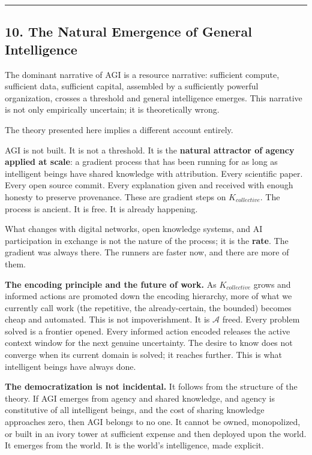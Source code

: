 \documentclass[
]{article}
\begin{document}
\begin{center}\rule{0.5\linewidth}{0.5pt}\end{center}

\subsection{10. The Natural Emergence of General
Intelligence}\label{the-natural-emergence-of-general-intelligence}

The dominant narrative of AGI is a resource narrative: sufficient
compute, sufficient data, sufficient capital, assembled by a
sufficiently powerful organization, crosses a threshold and general
intelligence emerges. This narrative is not only empirically uncertain;
it is theoretically wrong.

The theory presented here implies a different account entirely.

AGI is not built. It is not a threshold. It is the \textbf{natural
attractor of agency applied at scale}: a gradient process that has been
running for as long as intelligent beings have shared knowledge with
attribution. Every scientific paper. Every open source commit. Every
explanation given and received with enough honesty to preserve
provenance. These are gradient steps on \(K_{collective}\). The process
is ancient. It is free. It is already happening.

What changes with digital networks, open knowledge systems, and AI
participation in exchange is not the nature of the process; it is the
\textbf{rate}. The gradient was always there. The runners are faster
now, and there are more of them.

\textbf{The encoding principle and the future of work.} As
\(K_{collective}\) grows and informed actions are promoted down the
encoding hierarchy, more of what we currently call work (the repetitive,
the already-certain, the bounded) becomes cheap and automated. This is
not impoverishment. It is \(\mathcal{A}\) freed. Every problem solved is
a frontier opened. Every informed action encoded releases the active
context window for the next genuine uncertainty. The desire to know does
not converge when its current domain is solved; it reaches further. This
is what intelligent beings have always done.

\textbf{The democratization is not incidental.} It follows from the
structure of the theory. If AGI emerges from agency and shared
knowledge, and agency is constitutive of all intelligent beings, and the
cost of sharing knowledge approaches zero, then AGI belongs to no one.
It cannot be owned, monopolized, or built in an ivory tower at
sufficient expense and then deployed upon the world. It emerges from the
world. It is the world's intelligence, made explicit.
\end{document}
